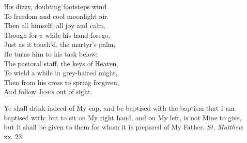 His dizzy, doubting footsteps wind \\
 To freedom and cool moonlight air. \\
  Then all himself, all joy and calm, \\
 Though for a while his hand forego, \\
 Just as it touch’d, the martyr’s palm, \\
 He turns him to his task below; \\
  The pastoral staff, the keys of Heaven, \\
 To wield a while in grey-haired might, \\
 Then from his cross to spring forgiven, \\
 And follow \textsc{Jesus} out of sight.\\


Ye shall drink indeed of My cup, and be baptised with the baptism that I am baptised with: but to sit on My right hand, and on My left, is not Mine to give, but it shall be given to them for whom it is prepared of My Father. \emph{St. Matthew} xx. 23.

